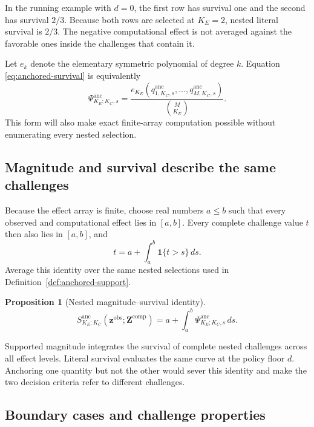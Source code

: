 \documentclass[11pt]{article}
\newcommand{\Sanc}{S^{\mathrm{anc}}}
\newcommand{\Psianc}{\Psi^{\mathrm{anc}}}
\newtheorem{proposition}{Proposition}
\theoremstyle{remark}
\begin{document}
In the running example with $d=0$, the first row has survival one and the
second has survival $2/3$. Because both rows are selected at $K_E=2$, nested
literal survival is $2/3$. The negative computational effect is not averaged
against the favorable ones inside the challenges that contain it.

Let $e_k$ denote the elementary symmetric polynomial of degree $k$. Equation
\eqref{eq:anchored-survival} is equivalently
\begin{equation}
\Psianc_{K_E;K_C,s}
=
\frac{e_{K_E}\left(
q^{\mathrm{anc}}_{1,K_C,s},\ldots,
q^{\mathrm{anc}}_{M,K_C,s}
\right)}{\binom{M}{K_E}}.
\label{eq:elementary-symmetric}
\end{equation}
This form will also make exact finite-array computation possible without
enumerating every nested selection.

\subsection{Magnitude and survival describe the same challenges}

Because the effect array is finite, choose real numbers $a\leq b$ such that
every observed and computational effect lies in $[a,b]$. Every complete
challenge value $t$ then also lies in $[a,b]$, and
\[
t=a+\int_a^b\mathbf 1\{t>s\}\,ds.
\]
Average this identity over the same nested selections used in
Definition~\ref{def:anchored-support}.

\begin{proposition}[Nested magnitude--survival identity]
\label{prop:survival-identity}
\begin{equation}
\Sanc_{K_E;K_C}
\left(\mathbf z^{\mathrm{obs}};\mathbf Z^{\mathrm{comp}}\right)
=
a+
\int_a^b
\Psianc_{K_E;K_C,s}\,ds.
\label{eq:nested-survival-identity}
\end{equation}
\end{proposition}

Supported magnitude integrates the survival of complete nested challenges
across all effect levels. Literal survival evaluates the same curve at the
policy floor $d$. Anchoring one quantity but not the other would sever this
identity and make the two decision criteria refer to different challenges.

\subsection{Boundary cases and challenge properties}
\label{sec:properties}
\end{document}
